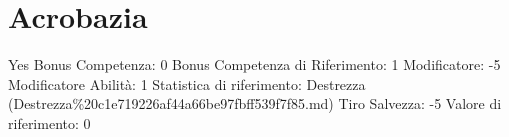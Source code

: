 \section{Acrobazia}\label{acrobazia}

\begin{description}
\tightlist
\item[Tags: ABI]
Yes Bonus Competenza: 0 Bonus Competenza di Riferimento: 1 Modificatore:
-5 Modificatore Abilità: 1 Statistica di riferimento: Destrezza
(Destrezza\%20c1e719226af44a66be97fbff539f7f85.md) Tiro Salvezza: -5
Valore di riferimento: 0
\end{description}
